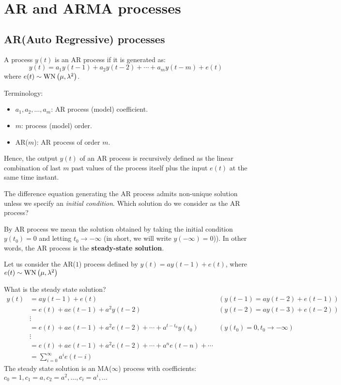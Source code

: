 \section{AR and ARMA processes}

\subsection{AR(Auto Regressive) processes}
A process $y(t)$ is an AR process if it is generated as:
\[
	\boxed{y(t)=a_{1} y(t-1)+a_{2} y(t-2)+\cdots+a_{m} y(t-m)+e(t)}
\]
where $e(t) \sim \operatorname{WN}\left(\mu, \lambda^{2}\right)$.

Terminology:
\begin{itemize}
	\item $a_{1}, a_{2}, \ldots, a_{m}$: AR process (model) coefficient.
	\item $m$: process (model) order.
	\item AR($m$): AR process of order $m$.
\end{itemize}
 
Hence, the output $y(t)$ of an AR process is recursively defined as the linear combination of last $m$ past values of the process itself plus the input $e(t)$ at the same time instant.

\begin{obs}
The difference equation generating the AR process admits non-unique solution unless we specify an \emph{initial condition}. Which solution do we consider as the AR process?

By AR process we mean the solution obtained by taking the initial condition $\boxed{y(t_{0})=0}$ and letting $t_{0} \to -\infty$ (in short, we will write $y(-\infty)=0$)). In other words, the AR process is the \textbf{steady-state solution}.
\end{obs}

\begin{example}
Let us consider the AR($1$) process defined by $y(t)=a y(t-1)+e(t)$, where $e(t) \sim \operatorname{WN}\left(\mu, \lambda^{2}\right)$

What is the steady state solution?
\begin{align*}
	y(t) & =a y(t-1)+e(t) & (y(t-1)=a y(t-2)+e(t-1)) \\
	& =e(t)+a e(t-1)+a^{2} y(t-2) & (y(t-2)=a y(t-3)+e(t-2)) \\
	& \vdots & \\
	& =e(t)+a e(t-1)+a^{2} e(t-2)+\cdots+a^{t-t_{0}} y\left(t_{0}\right) & (y\left(t_{0}\right)=0,t_{0} \to-\infty) \\
	& \vdots & \\
	& =e(t)+a e(t-1)+a^{2} e(t-2)+\cdots+a^{n} e(t-n)+\cdots\\
	&=\sum_{i=0}^{\infty} a^{i} e(t-i)
\end{align*}
The steady state solution is an MA($\infty$) process with coefficients: $c_{0}=1, c_{1}=a, c_{2}=a^{2}, \ldots, c_{i}=a^{i}, \ldots$
\end{example}

